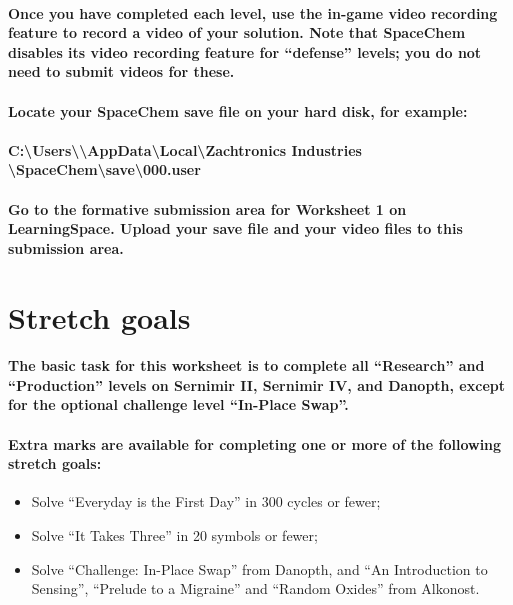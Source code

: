 \documentclass{../../../fal_assignment}
\begin{document}
\paragraph{
Once you have completed each level, use the in-game video recording feature to \textbf{record a video} of your solution.
Note that SpaceChem disables its video recording feature for ``defense'' levels; you do \textbf{not} need to submit videos for these.
}

\paragraph{
Locate your SpaceChem \textbf{save file} on your hard disk, for example:
}

\paragraph{
C:\textbackslash Users\textbackslash <your name>\textbackslash AppData\textbackslash Local\textbackslash Zachtronics Industries\\ \textbackslash SpaceChem\textbackslash save\textbackslash 000.user
}

\paragraph{
Go to the formative submission area for Worksheet 1 on LearningSpace.
\textbf{Upload} your save file and your video files to this submission area.
}

\section*{Stretch goals}

\paragraph{
The basic task for this worksheet is to complete \textbf{all} ``Research'' and ``Production'' levels on Sernimir II, Sernimir IV, and Danopth, except for the optional challenge level ``In-Place Swap''.
}

\paragraph{
Extra marks are available for completing one or more of the following stretch goals:
}
	\begin{itemize}
		\item Solve ``Everyday is the First Day'' in 300 cycles or fewer;
		\item Solve ``It Takes Three'' in 20 symbols or fewer;
		\item Solve ``Challenge: In-Place Swap'' from Danopth, and ``An Introduction to Sensing'', ``Prelude to a Migraine'' and ``Random Oxides'' from Alkonost.
	\end{itemize}
\end{document}
